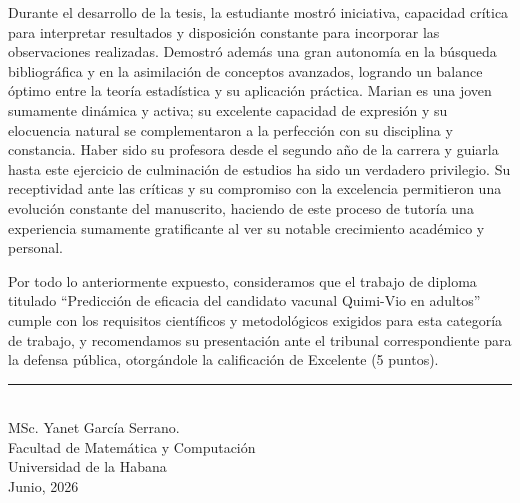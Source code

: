 \begin{opinion}
    Durante el desarrollo de la tesis, la estudiante mostró iniciativa, capacidad crítica para interpretar resultados y disposición constante para incorporar las observaciones realizadas. Demostró además una gran autonomía en la búsqueda bibliográfica y en la asimilación de conceptos avanzados, logrando un balance óptimo entre la teoría estadística y su aplicación práctica. Marian es una joven sumamente dinámica y activa; su excelente capacidad de expresión y su elocuencia natural se complementaron a la perfección con su disciplina y constancia. Haber sido su profesora desde el segundo año de la carrera y guiarla hasta este ejercicio de culminación de estudios ha sido un verdadero privilegio. Su receptividad ante las críticas y su compromiso con la excelencia permitieron una evolución constante del manuscrito, haciendo de este proceso de tutoría una experiencia sumamente gratificante al ver su notable crecimiento académico y personal.
    
    Por todo lo anteriormente expuesto, consideramos que el trabajo de diploma titulado “Predicción de eficacia del candidato vacunal Quimi-Vio en adultos” cumple con los requisitos científicos y metodológicos exigidos para esta categoría de trabajo, y recomendamos su presentación ante el tribunal correspondiente para la defensa pública, otorgándole la calificación de Excelente (5 puntos).
    
    \vspace{4cm}
    \begin{flushright}
    	\begin{minipage}{0.5\textwidth}
    		\rule{0.8\linewidth}{0.4pt}\\[4pt]
    		\raggedleft
    		MSc. Yanet García Serrano.\\
    		Facultad de Matemática y Computación\\
    		Universidad de la Habana\\
    		Junio, 2026
    	\end{minipage}
    \end{flushright}
\end{opinion}